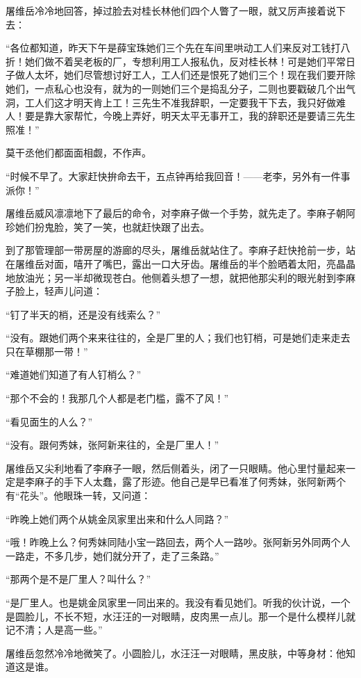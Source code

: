 \par 屠维岳冷冷地回答，掉过脸去对桂长林他们四个人瞥了一眼，就又厉声接着说下去：
\par “各位都知道，昨天下午是薛宝珠她们三个先在车间里哄动工人们来反对工钱打八折！她们做不着吴老板的厂，专想利用工人报私仇，反对桂长林！可是她们平常日子做人太坏，她们尽管想讨好工人，工人们还是恨死了她们三个！现在我们要开除她们，一点私心也没有，就为的一则她们三个是捣乱分子，二则也要戳破几个出气洞，工人们这才明天肯上工！三先生不准我辞职，一定要我干下去，我只好做难人！要是靠大家帮忙，今晚上弄好，明天太平无事开工，我的辞职还是要请三先生照准！”
\par 莫干丞他们都面面相觑，不作声。
\par “时候不早了。大家赶快拚命去干，五点钟再给我回音！——老李，另外有一件事派你！”
\par 屠维岳威风凛凛地下了最后的命令，对李麻子做一个手势，就先走了。李麻子朝阿珍她们扮鬼脸，笑了一笑，也就赶快跟了出去。
\par 到了那管理部一带房屋的游廊的尽头，屠维岳就站住了。李麻子赶快抢前一步，站在屠维岳对面，嘻开了嘴巴，露出一口大牙齿。屠维岳的半个脸晒着太阳，亮晶晶地放油光；另一半却微现苍白。他侧着头想了一想，就把他那尖利的眼光射到李麻子脸上，轻声儿问道：
\par “钉了半天的梢，还是没有线索么？”
\par “没有。跟她们两个来来往往的，全是厂里的人；我们也钉梢，可是她们走来走去只在草棚那一带！”
\par “难道她们知道了有人钉梢么？”
\par “那个不会的！我那几个人都是老门槛，露不了风！”
\par “看见面生的人么？”
\par “没有。跟何秀妹，张阿新来往的，全是厂里人！”
\par 屠维岳又尖利地看了李麻子一眼，然后侧着头，闭了一只眼睛。他心里忖量起来一定是李麻子的手下人太蠢，露了形迹。他自己是早已看准了何秀妹，张阿新两个有“花头”。他眼珠一转，又问道：
\par “昨晚上她们两个从姚金凤家里出来和什么人同路？”
\par “哦！昨晚上么？何秀妹同陆小宝一路回去，两个人一路吵。张阿新另外同两个人一路走，不多几步，她们就分开了，走了三条路。”
\par “那两个是不是厂里人？叫什么？”
\par “是厂里人。也是姚金凤家里一同出来的。我没有看见她们。听我的伙计说，一个是圆脸儿，不长不短，水汪汪的一对眼睛，皮肉黑一点儿。那一个是什么模样儿就记不清；人是高一些。”
\par 屠维岳忽然冷冷地微笑了。小圆脸儿，水汪汪一对眼睛，黑皮肤，中等身材：他知道这是谁。
